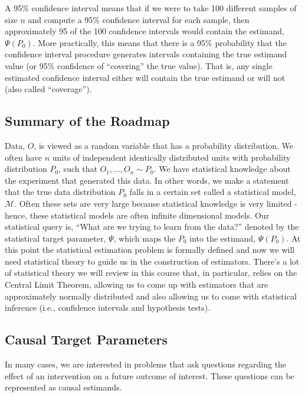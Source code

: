 \documentclass[12pt, krantz2,]{krantz}
\theoremstyle{definition}
\theoremstyle{definition}
\theoremstyle{definition}
\newcommand{\M}{\mathcal{M}}
\newcommand{\1}{\mathbbm{1}}
\begin{document}
A 95\% confidence interval means that if we were to take 100 different samples
of size \(n\) and compute a 95\% confidence interval for each sample, then
approximately 95 of the 100 confidence intervals would contain the estimand,
\(\Psi(P_0)\). More practically, this means that there is a 95\% probability
that the confidence interval procedure generates intervals containing the
true estimand value (or 95\% confidence of ``covering'' the true value). That is,
any single estimated confidence interval either will contain the true estimand
or will not (also called ``coverage'').

\hypertarget{roadmap-summary}{%
\subsection{Summary of the Roadmap}\label{roadmap-summary}}

Data, \(O\), is viewed as a random variable that has a probability distribution.
We often have \(n\) units of independent identically distributed units with
probability distribution \(P_0\), such that \(O_1, \ldots, O_n \sim P_0\). We have
statistical knowledge about the experiment that generated this data. In other
words, we make a statement that the true data distribution \(P_0\) falls in a
certain set called a statistical model, \(\M\). Often these sets are very large
because statistical knowledge is very limited - hence, these statistical models
are often infinite dimensional models. Our statistical query is, ``What are we
trying to learn from the data?'' denoted by the statistical target parameter,
\(\Psi\), which maps the \(P_0\) into the estimand, \(\Psi(P_0)\). At this point the
statistical estimation problem is formally defined and now we will need
statistical theory to guide us in the construction of estimators. There's a lot
of statistical theory we will review in this course that, in particular, relies
on the Central Limit Theorem, allowing us to come up with estimators that are
approximately normally distributed and also allowing us to come with statistical
inference (i.e., confidence intervals and hypothesis tests).

\hypertarget{causal}{%
\subsection{Causal Target Parameters}\label{causal}}

In many cases, we are interested in problems that ask questions regarding the
effect of an intervention on a future outcome of interest. These questions can
be represented as causal estimands.
\end{document}
